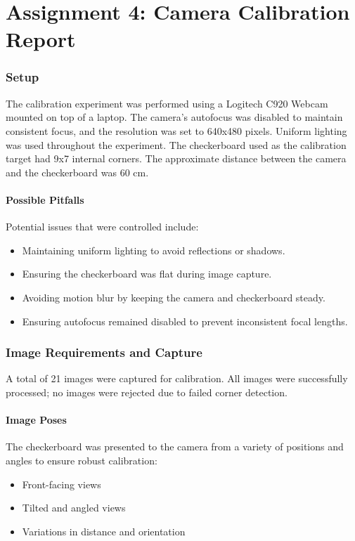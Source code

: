 \clearpage

\part{ Assignment 4: Camera Calibration Report}

\setcounter{section}{0}

\section{Setup}
The calibration experiment was performed using a Logitech C920 Webcam mounted on top of a laptop. The camera’s autofocus was disabled to maintain consistent focus, and the resolution was set to 640x480 pixels. Uniform lighting was used throughout the experiment. The checkerboard used as the calibration target had 9x7 internal corners. The approximate distance between the camera and the checkerboard was 60 cm.  

\subsection{Possible Pitfalls}
Potential issues that were controlled include:
\begin{itemize}
    \item Maintaining uniform lighting to avoid reflections or shadows.
    \item Ensuring the checkerboard was flat during image capture.
    \item Avoiding motion blur by keeping the camera and checkerboard steady.
    \item Ensuring autofocus remained disabled to prevent inconsistent focal lengths.
\end{itemize}

\section{Image Requirements and Capture}
A total of 21 images were captured for calibration. All images were successfully processed; no images were rejected due to failed corner detection.  

\subsection{Image Poses}
The checkerboard was presented to the camera from a variety of positions and angles to ensure robust calibration:
\begin{itemize}
    \item Front-facing views
    \item Tilted and angled views
    \item Variations in distance and orientation
\end{itemize}

